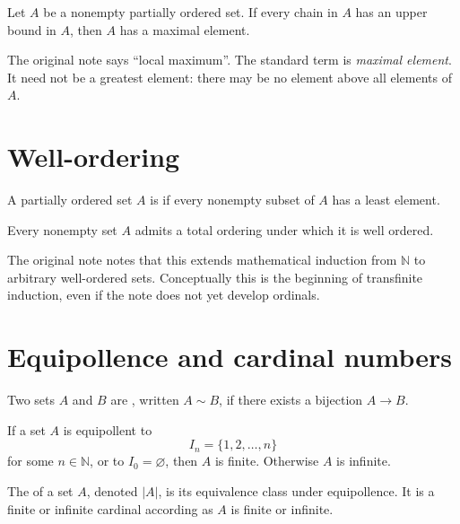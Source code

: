 \begin{theorem}
Let \(A\) be a nonempty partially ordered set.  If every chain in \(A\) has an upper bound in \(A\), then \(A\) has a maximal element.
\end{theorem}

\begin{caution}
The original note says ``local maximum''.  The standard term is \emph{maximal element}.  It need not be a greatest element: there may be no element above all elements of \(A\).
\end{caution}

\section{Well-ordering}

\begin{definition}
A partially ordered set \(A\) is  if every nonempty subset of \(A\) has a least element.
\end{definition}

\begin{proposition}
Every nonempty set \(A\) admits a total ordering under which it is well ordered.
\end{proposition}

\begin{remark}
The original note notes that this extends mathematical induction from \(\mathbb N\) to arbitrary well-ordered sets.  Conceptually this is the beginning of transfinite induction, even if the note does not yet develop ordinals.
\end{remark}

\section{Equipollence and cardinal numbers}

\begin{definition}
Two sets \(A\) and \(B\) are , written \(A\sim B\), if there exists a bijection \(A\to B\).
\end{definition}

\begin{definition}
If a set \(A\) is equipollent to
\[
  I_n=\{1,2,\dots,n\}
\]
for some \(n\in\mathbb N\), or to \(I_0=\varnothing\), then \(A\) is finite.  Otherwise \(A\) is infinite.
\end{definition}

\begin{definition}
The  of a set \(A\), denoted \(|A|\), is its equivalence class under equipollence.  It is a finite or infinite cardinal according as \(A\) is finite or infinite.
\end{definition}

